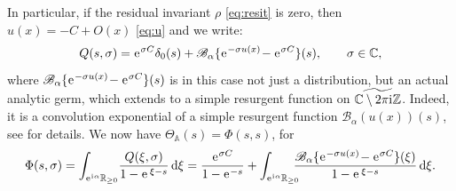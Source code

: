 \documentclass[a4paper,11pt]{amsart}
\numberwithin{equation}{section}
\newcommand{\R}{{\mathbb R}}
\renewcommand{\i}{\mathrm{i}\mkern.25\thinmuskip}
\renewcommand{\d}{\ensuremath{\operatorname{d}\!}}
\newcommand{\e}{\ensuremath{\mkern.25\thinmuskip\mathrm{e}\mkern.4\thinmuskip}}
\newcommand{\orbit}{\mathbb{A}}
\newcommand{\Borel}{\mathscr{B}}
\theoremstyle{definition}
\begin{document}
In particular, if the residual invariant $\rho$ \eqref{eq:resit} is zero, then 
$u(x)=-C+O(x)$ \eqref{eq:u} and we write:
\begin{equation}\label{eq:QBu}
Q(s,\sigma)=\e^{\sigma C}\delta_0(s)+ \Borel_{\alpha}\{\e^{-\sigma u(x)}\!-\e^{\sigma C}\}(s), \qquad \sigma\in\mathbb C,  
\end{equation}
where $\Borel_{\alpha}\{\e^{-\sigma u(x)}\!-\e^{\sigma C}\}(s)$ is in this case not just a distribution, but an actual analytic germ, which extends to a simple resurgent function on $\widetilde{\mathbb C\setminus 2\pi\i \mathbb Z}$. Indeed, it is a convolution exponential of a simple resurgent function $\Borel_{\alpha}(u(x))(s)$, see \cite[Proposition 3, \S 1]{MitschiSauzin} for details.
We now have $\Theta_\orbit(s)=\Phi(s,s)$, for 
\begin{equation}\label{eq:I}
\Phi(s,\sigma)=\int_{\e^{\i\alpha}\R_{\geq 0}}\! \frac{Q(\xi,\sigma)}{1-\e^{\,\xi-s}}\d\xi=
\frac{\e^{\sigma C}}{1-\e^{-s}}+\int_{\e^{\i\alpha}\R_{\geq 0}}\!\!\!\! \frac{\Borel_{\alpha}\{\e^{-\sigma u(x)}\!-\e^{\sigma C}\}(\xi)}{1-\e^{\,\xi-s}}\d\xi.
\end{equation}


\smallskip
\end{document}
